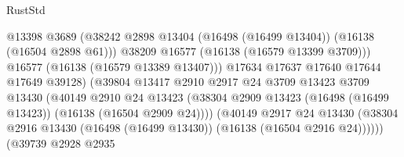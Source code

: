 \begin{lexlean}{RustStd}
\begin{coremodule}
                                              @13398
                                              @3689
                                              (@38242
                                                @2898
                                                @13404
                                                (@16498 (@16499 @13404))
                                                (@16138 (@16504 @2898 @61)))
                                              @38209
                                              @16577
                                              (@16138 (@16579 @13399 @3709)))
                                            @16577
                                            (@16138 (@16579 @13389 @13407)))
                                          @17634
                                          @17637
                                          @17640
                                          @17644
                                          @17649
                                          @39128)
                                        (@39804
                                          @13417
                                          @2910
                                          @2917
                                          @24
                                          @3709
                                          @13423
                                          @3709
                                          @13430
                                          (@40149
                                            @2910
                                            @24
                                            @13423
                                            (@38304
                                              @2909
                                              @13423
                                              (@16498 (@16499 @13423))
                                              (@16138 (@16504 @2909 @24))))
                                          (@40149
                                            @2917
                                            @24
                                            @13430
                                            (@38304
                                              @2916
                                              @13430
                                              (@16498 (@16499 @13430))
                                              (@16138 (@16504 @2916 @24))))))
                                      (@39739
                                        @2928
                                        @2935

\end{coremodule}
\end{lexlean}
